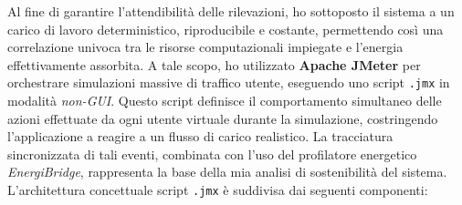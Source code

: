 Al fine di garantire l'attendibilità delle rilevazioni, ho sottoposto il sistema a un carico di lavoro deterministico, riproducibile e costante, permettendo così una correlazione univoca tra le risorse computazionali impiegate e l'energia effettivamente assorbita. A tale scopo, ho utilizzato \textbf{Apache JMeter} per orchestrare simulazioni massive di traffico utente, eseguendo uno script \texttt{.jmx} in modalità \textit{non-GUI}. Questo script definisce il comportamento simultaneo delle azioni effettuate da ogni utente virtuale durante la simulazione, costringendo l'applicazione a reagire a un flusso di carico realistico. La tracciatura sincronizzata di tali eventi, combinata con l'uso del profilatore energetico \textit{EnergiBridge}, rappresenta la base della mia analisi di sostenibilità del sistema. L'architettura concettuale script \texttt{.jmx} è suddivisa dai seguenti componenti:

